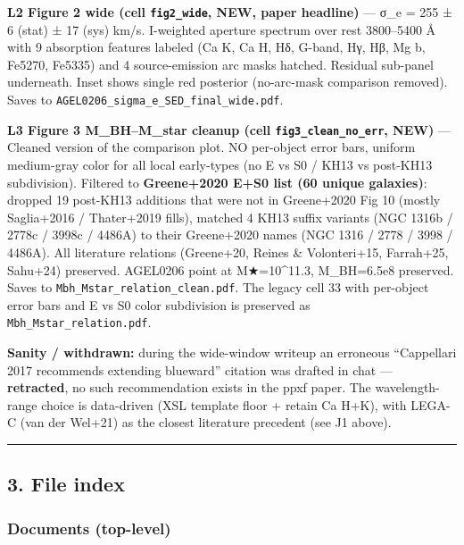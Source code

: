 \documentclass[
  10pt,
]{article}
\begin{document}
\textbf{L2 Figure 2 wide (cell \texttt{fig2\_wide}, NEW, paper headline)} --- σ\_e = 255 ± 6 (stat) ± 17 (sys) km/s. I-weighted aperture spectrum over rest 3800--5400 Å with 9 absorption features
labeled (Ca K, Ca H, Hδ, G-band, Hγ, Hβ, Mg b, Fe5270, Fe5335) and 4 source-emission arc masks hatched. Residual sub-panel underneath. Inset shows single red posterior (no-arc-mask comparison
removed). Saves to \texttt{AGEL0206\_sigma\_e\_SED\_final\_wide.pdf}.

\textbf{L3 Figure 3 M\_BH--M\_star cleanup (cell \texttt{fig3\_clean\_no\_err}, NEW)} --- Cleaned version of the comparison plot. NO per-object error bars, uniform medium-gray color for all local
early-types (no E vs S0 / KH13 vs post-KH13 subdivision). Filtered to \textbf{Greene+2020 E+S0 list (60 unique galaxies)}: dropped 19 post-KH13 additions that were not in Greene+2020 Fig 10 (mostly
Saglia+2016 / Thater+2019 fills), matched 4 KH13 suffix variants (NGC 1316b / 2778c / 3998c / 4486A) to their Greene+2020 names (NGC 1316 / 2778 / 3998 / 4486A). All literature relations (Greene+20,
Reines \& Volonteri+15, Farrah+25, Sahu+24) preserved. AGEL0206 point at M★=10\^{}11.3, M\_BH=6.5e8 preserved. Saves to \texttt{Mbh\_Mstar\_relation\_clean.pdf}. The legacy cell 33 with per-object
error bars and E vs S0 color subdivision is preserved as \texttt{Mbh\_Mstar\_relation.pdf}.

\textbf{Sanity / withdrawn:} during the wide-window writeup an erroneous ``Cappellari 2017 recommends extending blueward'' citation was drafted in chat --- \textbf{retracted}, no such recommendation
exists in the ppxf paper. The wavelength-range choice is data-driven (XSL template floor + retain Ca H+K), with LEGA-C (van der Wel+21) as the closest literature precedent (see J1 above).

\begin{center}\rule{0.5\linewidth}{0.5pt}\end{center}

\hypertarget{file-index}{%
\subsection{3. File index}\label{file-index}}

\hypertarget{documents-top-level}{%
\subsubsection{Documents (top-level)}\label{documents-top-level}}
\end{document}
